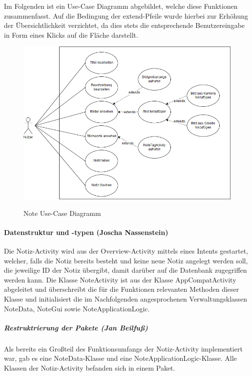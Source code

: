 Im Folgenden ist ein Use-Case Diagramm abgebildet, welche diese Funktionen zusammenfasst. Auf die Bedingung der extend-Pfeile wurde hierbei zur Erhöhung der Übersichtlichkeit verzichtet, da dies stets die entsprechende Benutzereingabe in Form eines Klicks auf die Fläche darstellt.

\begin{figure}[H]
\centering
\begin{minipage}[t]{1\textwidth} %
\caption{Note Use-Case Diagramm} %
\includegraphics[width=1 \textwidth]{img/noteUseCase}\\ %
\end{minipage}
\end{figure}

\paragraph{Datenstruktur und -typen (Joscha Nassenstein)}
Die Notiz-Activity wird aus der Overview-Activity mittels eines Intents gestartet, welcher, falls die Notiz bereits besteht und keine neue Notiz angelegt werden soll, die jeweilige ID der Notiz übergibt, damit darüber auf die Datenbank zugegriffen werden kann. Die Klasse NoteActivity ist aus der Klasse AppCompatActivity abgeleitet und überschreibt die für die Funktionen relevanten Methoden dieser Klasse und initialisiert die im Nachfolgenden angesprochenen Verwaltungsklassen NoteData, NoteGui sowie NoteApplicationLogic.

\subparagraph{Restruktrierung der Pakete (Jan Beilfuß)}
Als bereits ein Großteil des Funktionsumfangs der Notiz-Activity implementiert war, gab es eine NoteData-Klasse und eine NoteApplicationLogic-Klasse. Alle Klassen der Notiz-Activity befanden sich in einem Paket.

